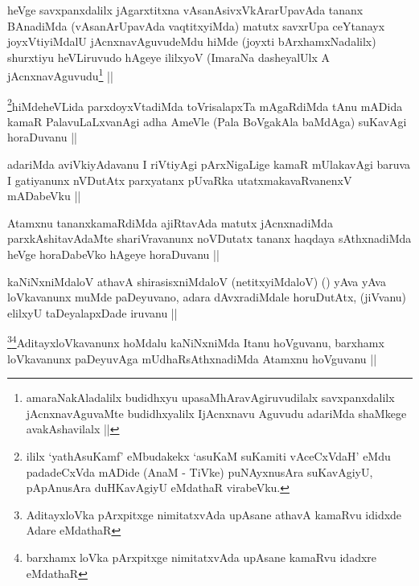 
\begin{artha}
heVge savxpanxdalilx jAgarxtitxna vAsanAsivxVkArarUpavAda tananx
BAnadiMda (vAsanArUpavAda vaqtitxyiMda) matutx savxrUpa ceYtanayx
joyxVtiyiMdalU jAcnxnavAguvudeMdu hiMde (joyxti bArxhamxNadalilx)
shurxtiyu heVLiruvudo hAgeye ililxyoV (ImaraNa dasheyalUlx A
jAcnxnavAguvudu\footnote{amaraNakAladalilx budidhxyu
  upasaMhAravAgiruvudilalx savxpanxdalilx jAcnxnavAguvaMte
  budidhxyalilx IjAcnxnavu Aguvudu adariMda shaMkege avakAshavilalx ||} ||
\end{artha}


\begin{artha}
\footnote{ililx `yathAsuKamf' eMbudakekx `asuKaM suKamiti vAceCxVdaH'
  eMdu padadeCxVda mADide (AnaM - TiVke) puNAyxnusAra suKavAgiyU,
  pApAnusAra duHKavAgiyU eMdathaR virabeVku.}hiMdeheVLida parxdoyxVtadiMda toVrisalapxTa mAgaRdiMda tAnu
mADida kamaR PalavuLaLxvanAgi adha AmeVle (Pala BoVgakAla baMdAga)
suKavAgi horaDuvanu ||
\end{artha}

\begin{artha}
adariMda aviVkiyAdavanu I riVtiyAgi pArxNigaLige kamaR mUlakavAgi
baruva I gatiyanunx nVDutAtx parxyatanx pUvaRka utatxmakavaRvanenxV
mADabeVku ||
\end{artha}

\begin{artha}
Atamxnu tananxkamaRdiMda ajiRtavAda matutx jAcnxnadiMda
parxkAshitavAdaMte shariVravanunx noVDutatx tananx haqdaya
sAthxnadiMda heVge horaDabeVko hAgeye horaDuvanu ||
\end{artha}


\begin{artha}
kaNiNxniMdaloV athavA shirasisxniMdaloV (netitxyiMdaloV) (\quad) yAva
yAva loVkavanunx muMde paDeyuvano, adara dAvxradiMdale horuDutAtx,
(jiVvanu) elilxyU taDeyalapxDade iruvanu ||
\end{artha}

\begin{artha}
\footnote{AditayxloVka pArxpitxge nimitatxvAda upAsane athavA kamaRvu
  ididxde Adare eMdathaR}\footnote{barxhamx loVka pArxpitxge
  nimitatxvAda upAsane kamaRvu idadxre eMdathaR}AditayxloVkavanunx hoMdalu kaNiNxniMda Itanu
hoVguvanu, barxhamx loVkavanunx paDeyuvAga mUdhaRsAthxnadiMda Atamxnu
hoVguvanu ||
\end{artha}

